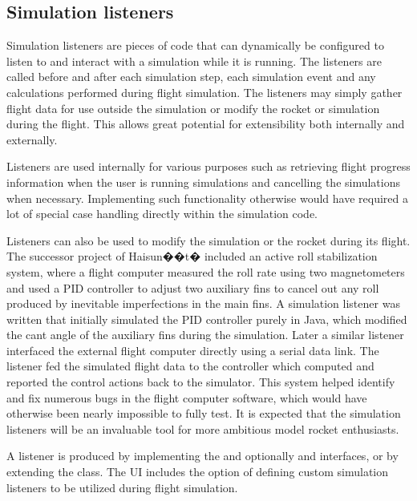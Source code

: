 \subsection{Simulation listeners}
\label{sec-listeners}

Simulation listeners are pieces of code that can dynamically be
configured to listen to and interact with a simulation while it is
running.  The listeners are called before and after each simulation
step, each simulation event and any calculations performed during
flight simulation.  The listeners may simply gather flight data for
use outside the simulation or modify the rocket or simulation during
the flight.  This allows great potential for extensibility both
internally and externally.

Listeners are used internally for various purposes such as retrieving
flight progress information when the user is running simulations and
cancelling the simulations when necessary.  Implementing such
functionality otherwise would have required a lot of special case
handling directly within the simulation code.

Listeners can also be used to modify the simulation or the rocket
during its flight.  The successor project of Haisun��t� included
an active roll stabilization system, where a flight computer 
measured the roll rate using two magnetometers and used a PID controller
to adjust two auxiliary fins to cancel out any roll produced by
inevitable imperfections in the main fins.  A simulation listener was
written that initially simulated the PID controller purely in Java, which
modified the cant angle of the auxiliary fins during the simulation.
Later a similar listener interfaced the external flight computer
directly using a serial data link.  The listener fed the simulated
flight data to the controller which computed and reported the control
actions back to the simulator.  This system helped identify and fix
numerous bugs in the flight computer software, which would have
otherwise been nearly impossible to fully test.  It is expected that
the simulation listeners will be an invaluable tool for more ambitious
model rocket enthusiasts.

A listener is produced by implementing the 
and optionally  and
 interfaces, or by extending
the  class.  The UI includes the
option of defining custom simulation listeners to be utilized during
flight simulation.



